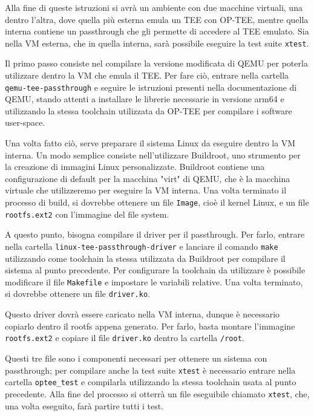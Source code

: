 \documentclass[12pt,italian]{report}
\begin{document}
Alla fine di queste istruzioni si avrà un ambiente con due macchine virtuali,
una dentro l'altra, dove quella più esterna emula un TEE con OP-TEE, mentre
quella interna contiene un passthrough che gli permette di accedere al TEE
emulato. Sia nella VM esterna, che in quella interna, sarà possibile eseguire
la test suite \texttt{xtest}.

\medbreak

Il primo passo consiste nel compilare la versione modificata di QEMU per
poterla utilizzare dentro la VM che emula il TEE.
Per fare ciò, entrare nella cartella \texttt{qemu-tee-passthrough} e
seguire le istruzioni presenti nella documentazione di QEMU,
stando attenti a installare le librerie necessarie in versione arm64
e utilizzando la stessa toolchain utilizzata da OP-TEE per compilare i
software user-space.

Una volta fatto ciò, serve preparare il sistema Linux da eseguire dentro la
VM interna. Un modo semplice consiste nell'utilizzare Buildroot, uno
strumento per la creazione di immagini Linux personalizzate.
Buildroot contiene una configurazione di default per la macchina "virt"
di QEMU, che è la macchina virtuale che utilizzeremo per eseguire la
VM interna.
Una volta terminato il processo di build, si dovrebbe ottenere un file
\texttt{Image}, cioè il kernel Linux, e un file \texttt{rootfs.ext2} con
l'immagine del file system.

A questo punto, bisogna compilare il driver per il passthrough.
Per farlo, entrare nella cartella \texttt{linux-tee-passthrough-driver}
e lanciare il comando \texttt{make} utilizzando come toolchain la stessa
utilizzata da Buildroot per compilare il sistema al punto precedente.
Per configurare la toolchain da utilizzare è possibile modificare il file
\texttt{Makefile} e impostare le variabili relative.
Una volta terminato, si dovrebbe ottenere un file \texttt{driver.ko}.

Questo driver dovrà essere caricato nella VM interna, dunque è necessario
copiarlo dentro il rootfs appena generato. Per farlo, basta montare l'immagine
\texttt{rootfs.ext2} e copiare il file \texttt{driver.ko} dentro la cartella
\texttt{/root}.

\medbreak

Questi tre file sono i componenti necessari per ottenere un sistema con
passthrough; per compilare anche la test suite \texttt{xtest} è necessario
entrare nella cartella \texttt{optee\_test} e compilarla utilizzando la stessa
toolchain usata al punto precedente.
Alla fine del processo si otterrà un file eseguibile chiamato \texttt{xtest},
che, una volta eseguito, farà partire tutti i test.
\end{document}
